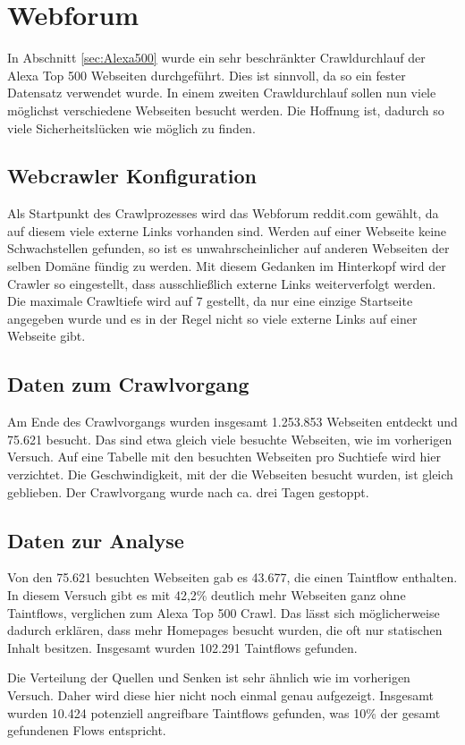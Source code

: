 \section{Webforum}
In Abschnitt \ref{sec:Alexa500} wurde ein sehr beschränkter Crawldurchlauf der Alexa Top 500 Webseiten durchgeführt. Dies ist sinnvoll, da so ein fester Datensatz verwendet wurde. In einem zweiten Crawldurchlauf sollen nun viele möglichst verschiedene Webseiten besucht werden. Die Hoffnung ist, dadurch so viele Sicherheitslücken wie möglich zu finden.
\subsection{Webcrawler Konfiguration}
Als Startpunkt des Crawlprozesses wird das Webforum reddit.com gewählt, da auf diesem viele externe Links vorhanden sind. Werden auf einer Webseite keine Schwachstellen gefunden, so ist es unwahrscheinlicher auf anderen Webseiten der selben Domäne fündig zu werden. Mit diesem Gedanken im Hinterkopf wird der Crawler so eingestellt, dass ausschließlich externe Links weiterverfolgt werden. \\
Die maximale Crawltiefe wird auf 7 gestellt, da nur eine einzige Startseite angegeben wurde und es in der Regel nicht so viele externe Links auf einer Webseite gibt.
\subsection{Daten zum Crawlvorgang}
Am Ende des Crawlvorgangs wurden insgesamt 1.253.853 Webseiten entdeckt und 75.621 besucht. Das sind etwa gleich viele besuchte Webseiten, wie im vorherigen Versuch. Auf eine Tabelle mit den besuchten Webseiten pro Suchtiefe wird hier verzichtet. Die Geschwindigkeit, mit der die Webseiten besucht wurden, ist gleich geblieben. Der Crawlvorgang wurde nach ca. drei Tagen gestoppt.
\subsection{Daten zur Analyse}
Von den 75.621 besuchten Webseiten gab es 43.677, die einen Taintflow enthalten. In diesem Versuch gibt es mit  42,2\% deutlich mehr Webseiten ganz ohne Taintflows, verglichen zum Alexa Top 500 Crawl. Das lässt sich möglicherweise dadurch erklären, dass mehr Homepages besucht wurden, die oft nur statischen Inhalt besitzen. Insgesamt wurden 102.291 Taintflows gefunden.

Die Verteilung der Quellen und Senken ist sehr ähnlich wie im vorherigen Versuch. Daher wird diese hier nicht noch einmal genau aufgezeigt. Insgesamt wurden 10.424 potenziell angreifbare Taintflows gefunden, was 10\% der gesamt gefundenen Flows entspricht.

